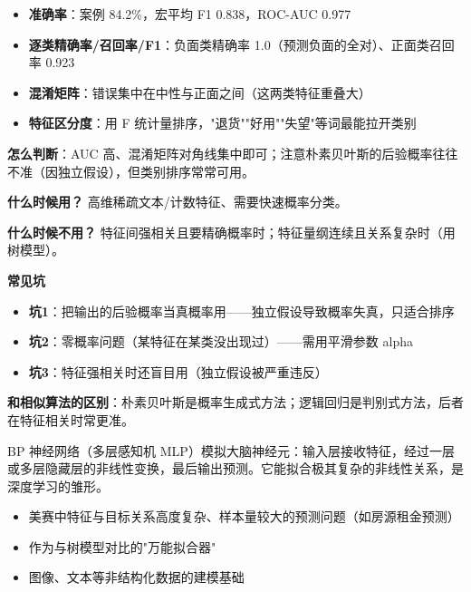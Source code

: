 \begin{algoresult}
\begin{itemize}
    \item \textbf{准确率}：案例 84.2\%，宏平均 F1 0.838，ROC-AUC 0.977
    \item \textbf{逐类精确率/召回率/F1}：负面类精确率 1.0（预测负面的全对）、正面类召回率 0.923
    \item \textbf{混淆矩阵}：错误集中在中性与正面之间（这两类特征重叠大）
    \item \textbf{特征区分度}：用 F 统计量排序，"退货""好用""失望"等词最能拉开类别
\end{itemize}

\textbf{怎么判断}：AUC 高、混淆矩阵对角线集中即可；注意朴素贝叶斯的后验概率往往不准（因独立假设），但类别排序常常可用。
\end{algoresult}

\begin{algonotes}
\textbf{什么时候用？} 高维稀疏文本/计数特征、需要快速概率分类。

\textbf{什么时候不用？} 特征间强相关且要精确概率时；特征量纲连续且关系复杂时（用树模型）。

\textbf{常见坑}
\begin{itemize}
    \item \textbf{坑1}：把输出的后验概率当真概率用——独立假设导致概率失真，只适合排序
    \item \textbf{坑2}：零概率问题（某特征在某类没出现过）——需用平滑参数 alpha
    \item \textbf{坑3}：特征强相关时还盲目用（独立假设被严重违反）
\end{itemize}

\textbf{和相似算法的区别}：朴素贝叶斯是概率生成式方法；逻辑回归是判别式方法，后者在特征相关时常更准。
\end{algonotes}


\begin{algointro}
BP 神经网络（多层感知机 MLP）模拟大脑神经元：输入层接收特征，经过一层或多层隐藏层的非线性变换，最后输出预测。它能拟合极其复杂的非线性关系，是深度学习的雏形。
\end{algointro}

\begin{algoscene}
\begin{itemize}
    \item 美赛中特征与目标关系高度复杂、样本量较大的预测问题（如房源租金预测）
    \item 作为与树模型对比的"万能拟合器"
    \item 图像、文本等非结构化数据的建模基础
\end{itemize}
\end{algoscene}

